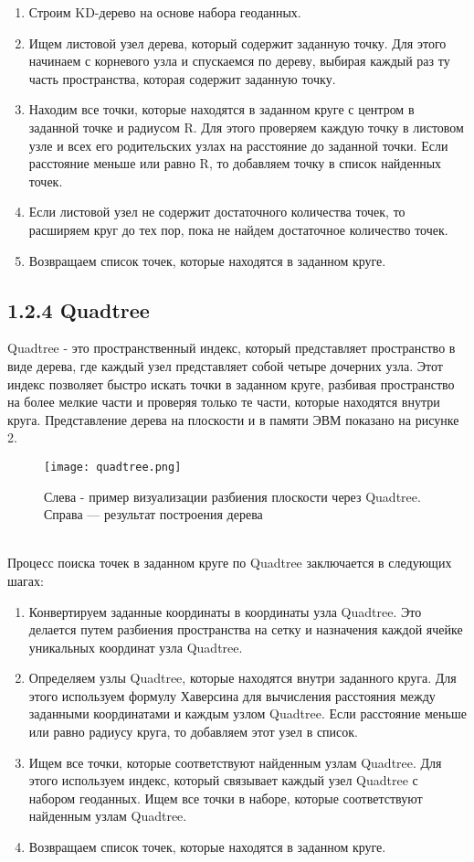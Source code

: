 \begin{enumerate}
    \item Строим KD-дерево на основе набора геоданных. 
    \item Ищем листовой узел дерева, который содержит заданную точку. Для этого начинаем с корневого узла и спускаемся по дереву, выбирая каждый раз ту часть пространства, которая содержит заданную точку.
    \item Находим все точки, которые находятся в заданном круге с центром в заданной точке и радиусом R. Для этого проверяем каждую точку в листовом узле и всех его родительских узлах на расстояние до заданной точки. Если расстояние меньше или равно R, то добавляем точку в список найденных точек.
    \item Если листовой узел не содержит достаточного количества точек, то расширяем круг до тех пор, пока не найдем достаточное количество точек.
    \item Возвращаем список точек, которые находятся в заданном круге.
\end{enumerate}


\subsection{1.2.4 Quadtree}
Quadtree - это пространственный индекс, который представляет пространство в виде дерева, где каждый узел представляет собой четыре дочерних узла. Этот индекс позволяет быстро искать точки в заданном круге, разбивая пространство на более мелкие части и проверяя только те части, которые находятся внутри круга. Представление дерева на плоскости и в памяти ЭВМ показано на рисунке 2. 
  \\
\begin{figure}[h]
    \centering
    \texttt{[image: quadtree.png]}
    \caption{Слева - пример визуализации разбиения плоскости через Quadtree. Справа — результат построения дерева}
\end{figure}
  \\
Процесс поиска точек в заданном круге по Quadtree заключается в следующих шагах:
\begin{enumerate}
    \item Конвертируем заданные координаты в координаты узла Quadtree. Это делается путем разбиения пространства на сетку и назначения каждой ячейке уникальных координат узла Quadtree.
    \item Определяем узлы Quadtree, которые находятся внутри заданного круга. Для этого используем формулу Хаверсина для вычисления расстояния между заданными координатами и каждым узлом Quadtree. Если расстояние меньше или равно радиусу круга, то добавляем этот узел в список.
    \item Ищем все точки, которые соответствуют найденным узлам Quadtree. Для этого используем индекс, который связывает каждый узел Quadtree с набором геоданных. Ищем все точки в наборе, которые соответствуют найденным узлам Quadtree.
    \item Возвращаем список точек, которые находятся в заданном круге.
\end{enumerate}


